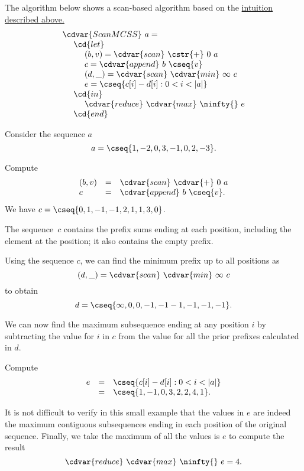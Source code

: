 \begin{flex}
\begin{algorithm}
The algorithm below shows a scan-based algorithm based on the
\href{gr:mcss::reduction:mcsse::optimal-reduction::intution}{intuition described above.}
%
\[
\begin{array}{l}
\cdvar{ScanMCSS}~a =
\\
~~~~\cd{let}
\\
~~~~~~~~(b,v) = \cdvar{scan}~\cstr{+}~0~a
\\
~~~~~~~~c = \cdvar{append}~b~\cseq{v}
\\
~~~~~~~~(d,\_) = \cdvar{scan}~\cdvar{min}~\infty~c
\\
~~~~~~~~e = \cseq{c[i]-d[i]: 0 < i < |a|}
\\
~~~~\cd{in}
\\
~~~~~~~~\cdvar{reduce}~\cdvar{max}~\ninfty{}~e
\\
~~~~\cd{end}
\end{array}
\]
\end{algorithm}
%


\begin{example}
\label{ex:mcs:scan-based}
Consider the sequence $a$
\[
a = \cseq{1, -2, 0, 3, -1, 0, 2, -3}.
\]

Compute
\[
\begin{array}{lcl}
(b,v) & = & \cdvar{scan}~\cdvar{+}~0~a
\\
c  & = & \cdvar{append}~ b~ \cseq{v}.
\end{array}
\]
We have $c =  \cseq{0, 1, -1, -1, 2, 1, 1, 3, 0}$.

The sequence~$c$ contains the prefix sums ending at each position,
including the element at the position; it also contains the empty
prefix.


Using the sequence $c$, we can find the minimum prefix up to all
positions as
\[
(d,\_) = \cdvar{scan}~\cdvar{min}~\infty~c
\]
to obtain
\[
d = \cseq{\infty, 0, 0, -1, -1 -1, -1, -1, -1}.
\]

We can now find the maximum subsequence ending at any position $i$ by
subtracting the value for $i$ in $c$ from the value for all the prior
prefixes calculated in $d$.
%

Compute
\[
\begin{array}{lcl}
e & = & \cseq{c[i]-d[i]: 0 < i < |a|} 
\\
  & = & \cseq{1, -1, 0, 3, 2, 2, 4, 1}.
\end{array}
\]

It is not difficult to verify in this small example that the values in
$e$ are indeed the maximum contiguous subsequences ending in each
position of the original sequence.  Finally, we take the maximum of
all the values is $e$ to compute the result
\[
\cdvar{reduce}~\cdvar{max}~\ninfty{}~e = 4.
\]

\end{example}
\end{flex}

